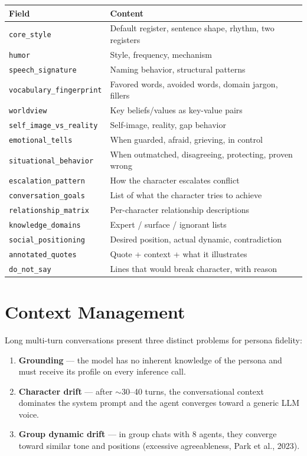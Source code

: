 \documentclass[12pt,a4paper]{article}
\begin{document}
\begin{longtable}{@{}ll@{}}
\toprule
\textbf{Field} & \textbf{Content} \\
\midrule
\texttt{core\_style} & Default register, sentence shape, rhythm, two registers \\
\texttt{humor} & Style, frequency, mechanism \\
\texttt{speech\_signature} & Naming behavior, structural patterns \\
\texttt{vocabulary\_fingerprint} & Favored words, avoided words, domain jargon, fillers \\
\texttt{worldview} & Key beliefs/values as key-value pairs \\
\texttt{self\_image\_vs\_reality} & Self-image, reality, gap behavior \\
\texttt{emotional\_tells} & When guarded, afraid, grieving, in control \\
\texttt{situational\_behavior} & When outmatched, disagreeing, protecting, proven wrong \\
\texttt{escalation\_pattern} & How the character escalates conflict \\
\texttt{conversation\_goals} & List of what the character tries to achieve \\
\texttt{relationship\_matrix} & Per-character relationship descriptions \\
\texttt{knowledge\_domains} & Expert / surface / ignorant lists \\
\texttt{social\_positioning} & Desired position, actual dynamic, contradiction \\
\texttt{annotated\_quotes} & Quote + context + what it illustrates \\
\texttt{do\_not\_say} & Lines that would break character, with reason \\
\bottomrule
\end{longtable}

\section{Context Management}

Long multi-turn conversations present three distinct problems for persona fidelity:

\begin{enumerate}
  \item \textbf{Grounding} --- the model has no inherent knowledge of the persona and must
        receive its profile on every inference call.
  \item \textbf{Character drift} --- after $\sim$30--40 turns, the conversational context
        dominates the system prompt and the agent converges toward a generic LLM voice.
  \item \textbf{Group dynamic drift} --- in group chats with 8 agents, they converge toward
        similar tone and positions (excessive agreeableness, Park et al., 2023).
\end{enumerate}
\end{document}
